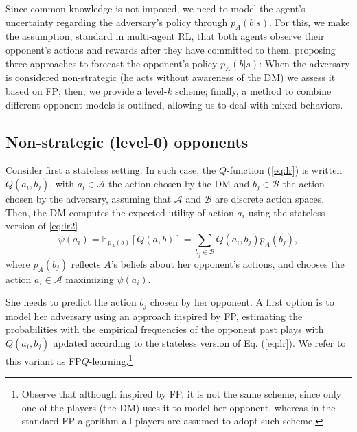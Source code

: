 Since common knowledge is not imposed,
we need to model the agent's uncertainty regarding the
adversary's policy through  $p_A (b | s)$.
 For this, we make the 
 assumption, standard in multi-agent RL, that both agents observe their opponent's actions and rewards
 after they have committed to them, proposing three approaches to forecast the opponent's policy $p_A (b | s)$:  %
When the adversary is considered non-strategic
(he acts without awareness of the DM) we assess it based 
on FP; then, we provide a level-$k$ scheme;
finally, a method to combine different opponent models
is outlined, allowing us to deal with mixed behaviors.

\subsection{Non-strategic (level-0) opponents}\label{sec:non}

Consider first a stateless setting. In such case, 
the $Q$-function (\ref{eq:lr}) is written
  $Q(a_i,b_j)$, with $a_i \in \mathcal{A}$ the action chosen by
 the DM and $b_j \in \mathcal{B}$ the action chosen by the adversary, assuming that $\mathcal{A}$ and $\mathcal{B}$ are discrete action spaces.
 Then, the DM  computes the expected utility of action $a_i$ using the stateless version of \eqref{eq:lr2}
\[ \psi(a_i) = \mathbb{E}_{p_A(b)} [Q(a,b)] = \sum_{b_j \in \mathcal{B}} Q(a_i, b_j) p_{A}(b_j), \]
where $p_A (b_j)$ reflects $A$'s beliefs about her opponent's actions,
 and chooses the action $a_i \in \mathcal{A}$
maximizing $\psi(a_i)$.
 
 She needs to predict the action
 $b_j$ chosen by her opponent. A first option is to model her adversary
 using an approach inspired by FP, 
 estimating the probabilities with the empirical frequencies of the opponent past plays
 with $Q(a_i, b_j)$ updated according to the stateless version of Eq. (\eqref{eq:lr}).
We refer to this variant as
FP$Q$-learning.\footnote{Observe that although inspired by FP,
it is not the same scheme, since only one of the players (the DM) uses it to 
model her opponent, whereas in the standard FP algorithm \cite{brown1951iterative} all players 
are assumed to adopt such scheme.}

